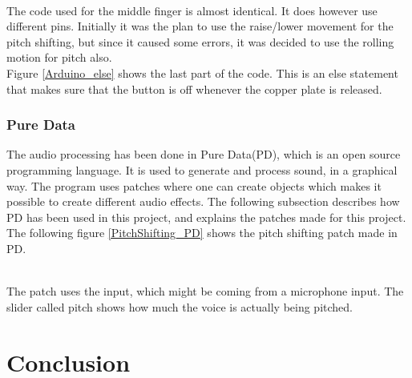 \begin{minipage}{\linewidth}%
\label{index_finger}
\end{minipage}\\

The code used for the middle finger is almost identical. It does however use different pins. Initially it was the plan to use the raise/lower movement for the pitch shifting, but since it caused some errors, it was decided to use the rolling motion for pitch also.\\

Figure \ref{Arduino_else} shows the last part of the code. This is an else statement that makes sure that the button is off whenever the copper plate is released. 

\begin{minipage}{\linewidth}%
\label{Arduino_else}
\end{minipage}


\subsubsection{Pure Data}

The audio processing has been done in Pure Data(PD)\citep{PD_Info}, which is an open source programming language. It is used to generate and process sound, in a graphical way. 
The program uses patches where one can create objects which makes it possible to create different audio effects. The following subsection describes how PD has been used in this project, and explains the patches made for this project. \\

The following figure \ref{PitchShifting_PD} shows the pitch shifting patch made in PD. \\


\begin{minipage}{\linewidth}%
\label{PitchShifting_PD}
\end{minipage}\\

The patch uses the input, which might be coming from a microphone input. The slider called pitch shows how much the voice is actually being pitched. 

\section{Conclusion}

